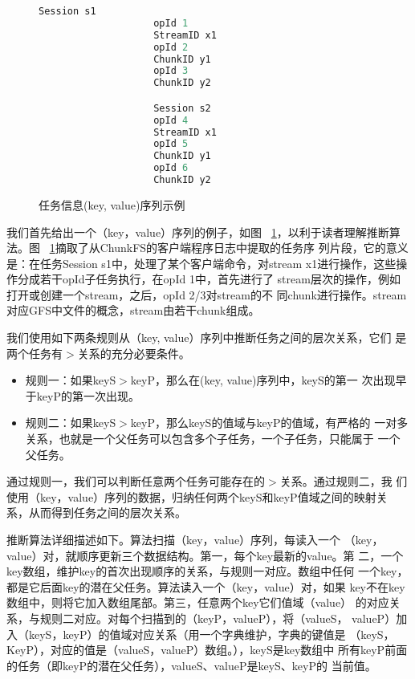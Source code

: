 \begin{figure}
  \centering
  \begin{minipage}{0.8\linewidth}
    \centering
    \begin{lstlisting}[language=C++]
                    Session s1
                    opId 1
                    StreamID x1
                    opId 2
                    ChunkID y1
                    opId 3
                    ChunkID y2

                    Session s2
                    opId 4
                    StreamID x1
                    opId 5
                    ChunkID y1
                    opId 6
                    ChunkID y2
    \end{lstlisting}
    \caption{任务信息(key, value)序列示例}
    \label{fig:keyvalue_sample}
  \end{minipage}
\end{figure}


我们首先给出一个（key，value）序列的例子，如图~
\ref{fig:keyvalue_sample}，以利于读者理解推断算法。图~
\ref{fig:keyvalue_sample}摘取了从ChunkFS的客户端程序日志中提取的任务序
列片段，它的意义是：在任务Session s1中，处理了某个客户端命令，对stream
x1进行操作，这些操作分成若干opId子任务执行，在opId 1中，首先进行了
stream层次的操作，例如打开或创建一个stream，之后，opId 2/3对stream的不
同chunk进行操作。stream对应GFS中文件的概念，stream由若干chunk组成。


我们使用如下两条规则从（key, value）序列中推断任务之间的层次关系，它们
是两个任务有$>$关系的充分必要条件。

\begin{itemize}

  \item 规则一：如果keyS$>$keyP，那么在(key, value)序列中，keyS的第一
  次出现早于keyP的第一次出现。

  \item 规则二：如果keyS$>$keyP，那么keyS的值域与keyP的值域，有严格的
  一对多关系，也就是一个父任务可以包含多个子任务，一个子任务，只能属于
  一个父任务。

\end{itemize}

通过规则一，我们可以判断任意两个任务可能存在的$>$关系。通过规则二，我
们使用（key，value）序列的数据，归纳任何两个keyS和keyP值域之间的映射关
系，从而得到任务之间的层次关系。

推断算法详细描述如下。算法扫描（key，value）序列，每读入一个
（key，value）对，就顺序更新三个数据结构。第一，每个key最新的value。第
二，一个key数组，维护key的首次出现顺序的关系，与规则一对应。数组中任何
一个key，都是它后面key的潜在父任务。算法读入一个（key，value）对，如果
key不在key数组中，则将它加入数组尾部。第三，任意两个key它们值域（value）
的对应关系，与规则二对应。对每个扫描到的（keyP，valueP），将（valueS，
valueP）加入（keyS，keyP）的值域对应关系（用一个字典维护，字典的键值是
（keyS，KeyP），对应的值是（valueS，valueP）数组。），keyS是key数组中
所有keyP前面的任务（即keyP的潜在父任务），valueS、valueP是keyS、keyP的
当前值。

